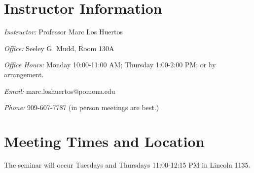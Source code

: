 
\section{Instructor Information}
\noindent \emph{Instructor:} Professor Marc Los Huertos

\noindent \emph{Office:} Seeley G. Mudd, Room 130A

\noindent \emph{Office Hours:} Monday 10:00-11:00 AM; Thursday 1:00-2:00 PM; or by arrangement.

\noindent \emph{Email:} marc.loshuertos@pomona.edu

\noindent \emph{Phone:} 909-607-7787 (in person meetings are best.)

\section{Meeting Times and Location} The seminar will occur Tuesdays and Thursdays 11:00-12:15 PM in Lincoln 1135. 



